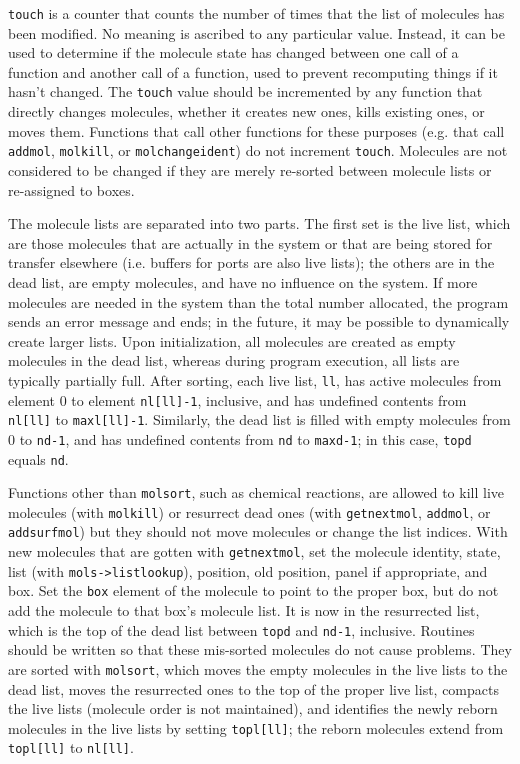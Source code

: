 \documentclass {scrbook}
\newcommand {\ttt} {\texttt}
\begin{document}
\ttt{touch} is a counter that counts the number of times that the list of molecules has been modified. No meaning is ascribed to any particular value. Instead, it can be used to determine if the molecule state has changed between one call of a function and another call of a function, used to prevent recomputing things if it hasn't changed. The \ttt{touch} value should be incremented by any function that directly changes molecules, whether it creates new ones, kills existing ones, or moves them. Functions that call other functions for these purposes (e.g. that call \ttt{addmol}, \ttt{molkill}, or \ttt{molchangeident}) do not increment \ttt{touch}. Molecules are not considered to be changed if they are merely re-sorted between molecule lists or re-assigned to boxes.

The molecule lists are separated into two parts. The first set is the live list, which are those molecules that are actually in the system or that are being stored for transfer elsewhere (i.e. buffers for ports are also live lists); the others are in the dead list, are empty molecules, and have no influence on the system. If more molecules are needed in the system than the total number allocated, the program sends an error message and ends; in the future, it may be possible to dynamically create larger lists. Upon initialization, all molecules are created as empty molecules in the dead list, whereas during program execution, all lists are typically partially full. After sorting, each live list, \ttt{ll}, has active molecules from element 0 to element \ttt{nl[ll]-1}, inclusive, and has undefined contents from \ttt{nl[ll]} to \ttt{maxl[ll]-1}. Similarly, the dead list is filled with empty molecules from 0 to \ttt{nd-1}, and has undefined contents from \ttt{nd} to \ttt{maxd-1}; in this case, \ttt{topd} equals \ttt{nd}.

Functions other than \ttt{molsort}, such as chemical reactions, are allowed to kill live molecules (with \ttt{molkill}) or resurrect dead ones (with \ttt{getnextmol}, \ttt{addmol}, or \ttt{addsurfmol}) but they should not move molecules or change the list indices. With new molecules that are gotten with \ttt{getnextmol}, set the molecule identity, state, list (with \ttt{mols->listlookup}), position, old position, panel if appropriate, and box. Set the \ttt{box} element of the molecule to point to the proper box, but do not add the molecule to that box's molecule list. It is now in the resurrected list, which is the top of the dead list between \ttt{topd} and \ttt{nd-1}, inclusive. Routines should be written so that these mis-sorted molecules do not cause problems. They are sorted with \ttt{molsort}, which moves the empty molecules in the live lists to the dead list, moves the resurrected ones to the top of the proper live list, compacts the live lists (molecule order is not maintained), and identifies the newly reborn molecules in the live lists by setting \ttt{topl[ll]}; the reborn molecules extend from \ttt{topl[ll]} to \ttt{nl[ll]}.
\end{document}
